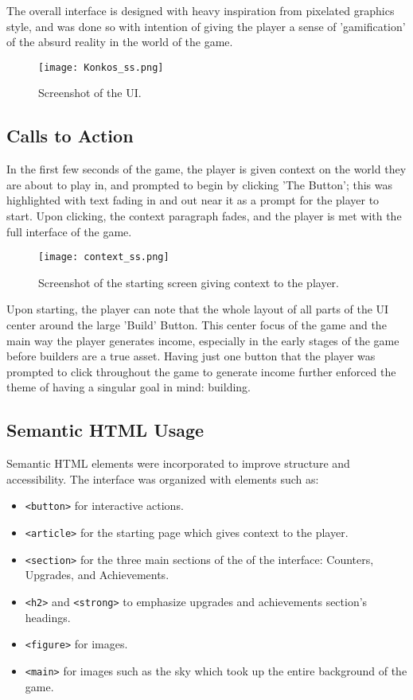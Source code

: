 \documentclass{article}
\begin{document}
The overall interface is designed with heavy inspiration from pixelated graphics style, and was done so with intention of giving the player a sense of 'gamification' of the absurd reality in the world of the game. 
\begin{figure}[H]
    \centering
    \texttt{[image: Konkos\_ss.png]}
    \caption{Screenshot of the UI.}
    \label{fig:screenshot-UI}
\end{figure}

\subsection*{Calls to Action}

In the first few seconds of the game, the player is given context on the world they are about to play in, and prompted to begin by clicking 'The Button'; this was highlighted with text fading in and out near it as a prompt for the player to start. Upon clicking, the context paragraph fades, and the player is met with the full interface of the game.
\begin{figure}[H]
    \centering
    \texttt{[image: context\_ss.png]}
    \caption{Screenshot of the starting screen giving context to the player.}
    \label{fig:screenshot-context}
\end{figure}
Upon starting, the player can note that the whole layout of all parts of the UI center around the large 'Build' Button. This center focus of the game and the main way the player generates income, especially in the early stages of the game before builders are a true asset. Having just one button that the player was prompted to click throughout the game to generate income further enforced the theme of having a singular goal in mind: building. 

\subsection*{Semantic HTML Usage}

Semantic HTML elements were incorporated to improve structure and accessibility. The interface was organized with elements such as:
\begin{itemize}
    \item \texttt{<button>} for interactive actions.
    \item \texttt{<article>} for the starting page which gives context to the player.
    \item \texttt{<section>} for the three main sections of the of the interface: Counters, Upgrades, and Achievements. 
    \item \texttt{<h2>} and \texttt{<strong>} to emphasize upgrades and achievements section's headings.
    \item \texttt{<figure>} for images. 
    \item \texttt{<main>} for images such as the sky which took up the entire background of the game.
\end{itemize}
\end{document}
